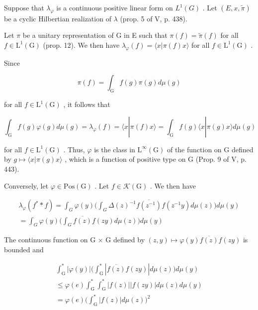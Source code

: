 Suppose that \(\lambda_{\varphi}\) is a continuous positive linear form on \(L^{1}(G)\) . Let \((E, x, \widetilde{\pi})\) be a cyclic Hilbertian realization of \(\lambda\) (prop. 5 of V, p. 438).

Let \(\pi\) be a unitary representation of G in E such that \(\pi(f) = \widetilde{\pi}(f)\) for all \(f \in \mathrm{L}^1(\mathrm{G})\) (prop. 12). We then have \(\lambda_{\varphi}(f) = \langle x | \pi(f)x \rangle\) for all \(f \in \mathrm{L}^1(\mathrm{G})\) .

Since

\[
\pi (f) = \int_ {\mathrm{G}} f (g) \pi (g) d \mu (g)
\]

for all \(f\in \mathrm{L}^1 (\mathrm{G})\) , it follows that

\[
\int_ {\mathrm{G}} f (g) \varphi (g) d \mu (g) = \lambda_ {\varphi} (f) = \langle x | \pi (f) x \rangle = \int_ {\mathrm{G}} f (g) \langle x | \pi (g) x \rangle d \mu (g)
\]

for all \(f \in \mathrm{L}^{1}(\mathrm{G})\) . Thus, \(\varphi\) is the class in \(\mathrm{L}^{\infty}(\mathrm{G})\) of the function on G defined by \(g \mapsto \langle x | \pi(g)x \rangle\) , which is a function of positive type on G (Prop. 9 of V, p. 443).

Conversely, let \(\varphi\in\mathrm{Pos}(\mathrm{G})\) . Let \(f\in\mathcal{K}(\mathrm{G})\) . We then have

\[
\begin{array}{c} \lambda_ {\varphi} (f ^ {*} * f) = \int_ {G} \varphi (y) \Big (\int_ {G} \Delta (z) ^ {- 1} \overline {{f (z ^ {- 1})}} f (z ^ {- 1} y) d \mu (z) \Big) d \mu (y) \\ = \int_ {G} \varphi (y) \Big (\int_ {G} \overline {{f (z)}} f (z y) d \mu (z) \Big) d \mu (y) \end{array}
\]

The continuous function on G × G defined by \((z, y) \mapsto \varphi(y)\overline{f(z)}f(zy)\) is bounded and

\[
\begin{array}{c} \int_ {\mathrm{G}} ^ {*} | \varphi (y) | \Big (\int_ {\mathrm{G}} ^ {*} | \overline {{f (z)}} f (z y) | d \mu (z) \Big) d \mu (y) \\ \leqslant \varphi (e) \int_ {\mathrm{G}} ^ {*} \int_ {\mathrm{G}} ^ {*} | f (z) | | f (z y) | d \mu (z) d \mu (y) \\ = \varphi (e) \Big (\int_ {\mathrm{G}} ^ {*} | f (z) | d \mu (z) \Big) ^ {2} \end{array}
\]

